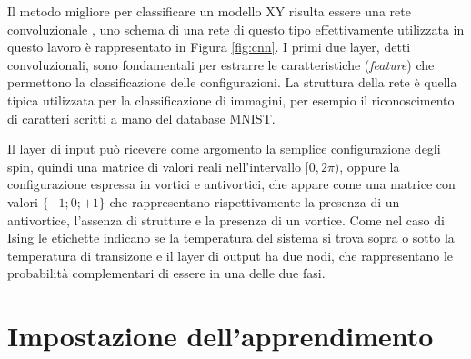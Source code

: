 \documentclass{article}
\begin{document}
Il metodo migliore per classificare un modello XY risulta essere una rete convoluzionale \cite{melko}, uno schema di una rete di questo tipo effettivamente utilizzata in questo lavoro è rappresentato in Figura \ref{fig:cnn}.
I primi due layer, detti convoluzionali, sono fondamentali per estrarre le caratteristiche (\emph{feature}) che permettono la classificazione delle configurazioni.
La struttura della rete è quella tipica utilizzata per la classificazione di immagini, per esempio il riconoscimento di caratteri scritti a mano del database MNIST.

Il layer di input può ricevere come argomento la semplice configurazione degli spin, quindi una matrice di valori reali nell'intervallo $[0,2\pi)$, oppure la configurazione espressa in vortici e antivortici, che appare come una matrice con valori $\{-1;0;+1\}$ che rappresentano rispettivamente la presenza di un antivortice, l'assenza di strutture e la presenza di un vortice.
Come nel caso di Ising le etichette indicano se la temperatura del sistema si trova sopra o sotto la temperatura di transizone e il layer di output ha due nodi, che rappresentano le probabilità complementari di essere in una delle due fasi.



\section{Impostazione dell'apprendimento}
\end{document}
